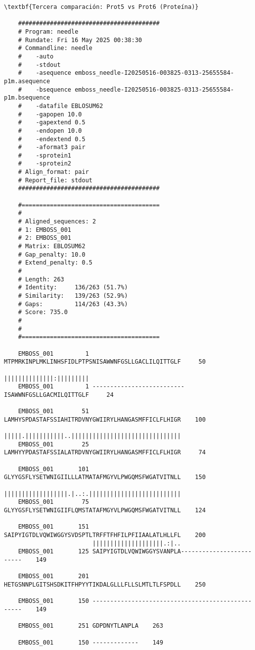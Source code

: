 \documentclass[fleqn,10pt]{article}
\begin{document}
    \begin{lstlisting}[style=outputstyle, basicstyle=\ttfamily\footnotesize]
    \textbf{Tercera comparación: Prot5 vs Prot6 (Proteína)}

    ########################################
    # Program: needle
    # Rundate: Fri 16 May 2025 00:38:30
    # Commandline: needle
    #    -auto
    #    -stdout
    #    -asequence emboss_needle-I20250516-003825-0313-25655584-p1m.asequence
    #    -bsequence emboss_needle-I20250516-003825-0313-25655584-p1m.bsequence
    #    -datafile EBLOSUM62
    #    -gapopen 10.0
    #    -gapextend 0.5
    #    -endopen 10.0
    #    -endextend 0.5
    #    -aformat3 pair
    #    -sprotein1
    #    -sprotein2
    # Align_format: pair
    # Report_file: stdout
    ########################################

    #=======================================
    #
    # Aligned_sequences: 2
    # 1: EMBOSS_001
    # 2: EMBOSS_001
    # Matrix: EBLOSUM62
    # Gap_penalty: 10.0
    # Extend_penalty: 0.5
    #
    # Length: 263
    # Identity:     136/263 (51.7%)
    # Similarity:   139/263 (52.9%)
    # Gaps:         114/263 (43.3%)
    # Score: 735.0
    # 
    #
    #=======================================

    EMBOSS_001         1 MTPMRKINPLMKLINHSFIDLPTPSNISAWWNFGSLLGACLILQITTGLF     50
                                                   ||||||||||||||:|||||||||
    EMBOSS_001         1 --------------------------ISAWWNFGSLLGACMILQITTGLF     24

    EMBOSS_001        51 LAMHYSPDASTAFSSIAHITRDVNYGWIIRYLHANGASMFFICLFLHIGR    100
                         |||||.|||||||||||..|||||||||||||||||||||||||||||||
    EMBOSS_001        25 LAMHYYPDASTAFSSIALATRDVNYGWIIRYLHANGASMFFICLFLHIGR     74

    EMBOSS_001       101 GLYYGSFLYSETWNIGIILLLATMATAFMGYVLPWGQMSFWGATVITNLL    150
                         ||||||||||||||||||.|..:.||||||||||||||||||||||||||
    EMBOSS_001        75 GLYYGSFLYSETWNIGIIFLQMSTATAFMGYVLPWGQMSFWGATVITNLL    124

    EMBOSS_001       151 SAIPYIGTDLVQWIWGGYSVDSPTLTRFFTFHFILPFIIAALATLHLLFL    200
                         ||||||||||||||||||||.:|..                         
    EMBOSS_001       125 SAIPYIGTDLVQWIWGGYSVANPLA-------------------------    149

    EMBOSS_001       201 HETGSNNPLGITSHSDKITFHPYYTIKDALGLLLFLLSLMTLTLFSPDLL    250
                                                                           
    EMBOSS_001       150 --------------------------------------------------    149

    EMBOSS_001       251 GDPDNYTLANPLA    263
                                      
    EMBOSS_001       150 -------------    149

    \end{lstlisting}
\end{document}
